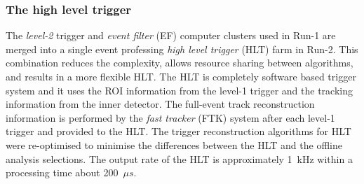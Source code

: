 
\subsubsection{The high level trigger}
\label{subsubsec:ae_HLT}
The \textit{level-2} trigger and \textit{event filter} (EF) computer clusters used in Run-1 are merged into a single event professing \textit{high level trigger} (HLT) farm in Run-2.
This combination reduces the complexity, allows resource sharing between algorithms, and results in a more flexible HLT.
The HLT is completely software based trigger system and it uses the ROI information from the level-1 trigger and the tracking information from the inner detector.
The full-event track reconstruction information is performed by the \textit{fast tracker} (FTK) system after each level-1 trigger and provided to the HLT.	 
The trigger reconstruction algorithms for HLT were re-optimised to minimise the differences between the HLT and the offline analysis selections.
The output rate of the HLT is approximately 1~kHz within a processing time about 200~$\mu s$.


